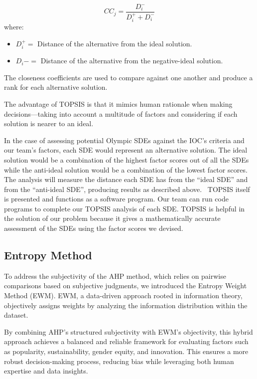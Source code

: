\documentclass[12pt]{article}
\begin{document}
\[
CC_{j} = \frac{D_{i}^-}{D_{i}^+ + D_{i}^-}
\]
where: 
\begin{itemize}
   \item \( D_{i}^+ = \) Distance of the alternative from the ideal solution.
    \item \(D_{i}-=\) Distance of the alternative from the negative-ideal solution.
\end{itemize}
The closeness coefficients are used to compare against one another and produce a rank for each alternative solution.

The advantage of TOPSIS is that it mimics human rationale when making decisions—taking into account a multitude of factors and considering if each solution is nearer to an ideal.

In the case of assessing potential Olympic SDEs against the IOC’s criteria and our team’s factors, each SDE would represent an alternative solution. The ideal solution would be a combination of the highest factor scores out of all the SDEs while the anti-ideal solution would be a combination of the lowest factor scores. The analysis will measure the distance each SDE has from the “ideal SDE” and from the “anti-ideal SDE”, producing results as described above. 
TOPSIS itself is presented and functions as a software program. Our team can run code programs to complete our TOPSIS analysis of each SDE.
TOPSIS is helpful in the solution of our problem because it gives a mathematically accurate assessment of the SDEs using the factor scores we devised.

\subsection{Entropy Method}
To address the subjectivity of the AHP method, which relies on pairwise comparisons based on subjective judgments, we introduced the Entropy Weight Method (EWM). EWM, a data-driven approach rooted in information theory, objectively assigns weights by analyzing the information distribution within the dataset.





By combining AHP's structured subjectivity with EWM's objectivity, this hybrid approach achieves a balanced and reliable framework for evaluating factors such as popularity, sustainability, gender equity, and innovation. This ensures a more robust decision-making process, reducing bias while leveraging both human expertise and data insights.
\end{document}
